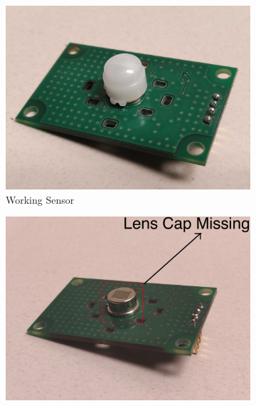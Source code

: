 \documentclass[manuscript,screen,review]{acmart} %
\providecommand{\DIFdelbegin}{} %
\providecommand{\DIFaddbeginFL}{} %
\providecommand{\DIFaddendFL}{} %
\providecommand{\DIFdelbeginFL}{} %
\providecommand{\DIFdelendFL}{} %
\newcommand{\DIFscaledelfig}{0.5}
\newlength{\DIFdelgraphicswidth} %
\newlength{\DIFdelgraphicsheight} %
\newcommand{\DIFaddincludegraphics}[2][]{{\color{blue}\fbox{\DIFOincludegraphics[#1]{#2}}}} %
\newcommand{\DIFdelincludegraphics}[2][]{%
\sbox{\DIFdelgraphicsbox}{\DIFOincludegraphics[#1]{#2}}%
\settoboxwidth{\DIFdelgraphicswidth}{\DIFdelgraphicsbox} %
\settoboxtotalheight{\DIFdelgraphicsheight}{\DIFdelgraphicsbox} %
\scalebox{\DIFscaledelfig}{%
\parbox[b]{\DIFdelgraphicswidth}{\usebox{\DIFdelgraphicsbox}\\[-\baselineskip] \rule{\DIFdelgraphicswidth}{0em}}\llap{\resizebox{\DIFdelgraphicswidth}{\DIFdelgraphicsheight}{%
\setlength{\unitlength}{\DIFdelgraphicswidth}%
\begin{picture}(1,1)%
\thicklines\linethickness{2pt} %
{\color[rgb]{1,0,0}\put(0,0){\framebox(1,1){}}}%
{\color[rgb]{1,0,0}\put(0,0){\line( 1,1){1}}}%
{\color[rgb]{1,0,0}\put(0,1){\line(1,-1){1}}}%
\end{picture}%
}\hspace*{3pt}}} %
} %
\DeclareRobustCommand{\DIFdelbegin}{\DIFOdelbegin \let\includegraphics\DIFdelincludegraphics} %
\DeclareRobustCommand{\DIFaddbeginFL}{\DIFOaddbeginFL \let\includegraphics\DIFaddincludegraphics} %
\DeclareRobustCommand{\DIFaddendFL}{\DIFOaddendFL \let\includegraphics\DIFOincludegraphics} %
\DeclareRobustCommand{\DIFdelbeginFL}{\DIFOdelbeginFL \let\includegraphics\DIFdelincludegraphics} %
\DeclareRobustCommand{\DIFdelendFL}{\DIFOaddendFL \let\includegraphics\DIFOincludegraphics} %
\begin{document}
\DIFdelbegin %
\DIFdelendFL \DIFaddbeginFL \begin{figure}\DIFaddendFL \centering
	\small
	\DIFdelbeginFL %
\DIFdelendFL \DIFaddbeginFL \begin{subfigure}[t]{0.24\textwidth}
		\DIFaddendFL \centering
		\includegraphics[width=\textwidth]{figures/platform/failure_photographs/WorkingSensor-proper.jpg}
		\caption{\footnotesize Working Sensor}
		\label{fig:working}
	\end{subfigure}
	\hspace{0.10ex}\DIFdelbeginFL %
\DIFdelendFL \DIFaddbeginFL \begin{subfigure}[t]{0.24\textwidth}
		\DIFaddendFL \centering
		\DIFaddbeginFL \includegraphics[width=\textwidth]{figures/platform/failure_photographs/ClassI-LensCapRemoved-annotated-jpg.jpg}

\end{subfigure}
\end{figure}
\end{document}
